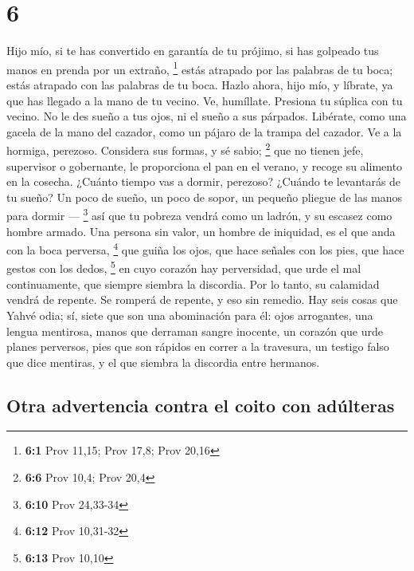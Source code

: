 \hypertarget{section-5}{%
\section{6}\label{section-5}}

 Hijo mío, si te has convertido en garantía de tu prójimo,
si has golpeado tus manos en prenda por un extraño, \footnote{\textbf{6:1}
  Prov 11,15; Prov 17,8; Prov 20,16}  estás atrapado por
las palabras de tu boca; estás atrapado con las palabras de tu boca.
 Hazlo ahora, hijo mío, y líbrate, ya que has llegado a la
mano de tu vecino. Ve, humíllate. Presiona tu súplica con tu vecino.
 No le des sueño a tus ojos, ni el sueño a sus párpados.
 Libérate, como una gacela de la mano del cazador, como un
pájaro de la trampa del cazador.  Ve a la hormiga,
perezoso. Considera sus formas, y sé sabio; \footnote{\textbf{6:6} Prov
  10,4; Prov 20,4}  que no tienen jefe, supervisor o
gobernante,  le proporciona el pan en el verano, y recoge
su alimento en la cosecha.  ¿Cuánto tiempo vas a dormir,
perezoso? ¿Cuándo te levantarás de tu sueño?  Un poco de
sueño, un poco de sopor, un pequeño pliegue de las manos para dormir ---
\footnote{\textbf{6:10} Prov 24,33-34}  así que tu
pobreza vendrá como un ladrón, y su escasez como hombre armado.
 Una persona sin valor, un hombre de iniquidad, es el que
anda con la boca perversa, \footnote{\textbf{6:12} Prov 10,31-32}
 que guiña los ojos, que hace señales con los pies, que
hace gestos con los dedos, \footnote{\textbf{6:13} Prov 10,10}
 en cuyo corazón hay perversidad, que urde el mal
continuamente, que siempre siembra la discordia.  Por lo
tanto, su calamidad vendrá de repente. Se romperá de repente, y eso sin
remedio.  Hay seis cosas que Yahvé odia; sí, siete que
son una abominación para él:  ojos arrogantes, una lengua
mentirosa, manos que derraman sangre inocente,  un
corazón que urde planes perversos, pies que son rápidos en correr a la
travesura,  un testigo falso que dice mentiras, y el que
siembra la discordia entre hermanos.

\hypertarget{otra-advertencia-contra-el-coito-con-aduxfalteras}{%
\subsection{Otra advertencia contra el coito con
adúlteras}\label{otra-advertencia-contra-el-coito-con-aduxfalteras}}

